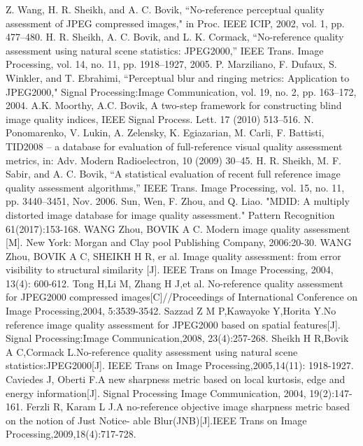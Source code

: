 \begin{thebibliography}{99}
%
%
 Z. Wang, H. R. Sheikh, and A. C. Bovik, “No-reference perceptual quality assessment of JPEG compressed images," in Proc. IEEE ICIP, 2002, vol. 1, pp. 477–480.
 H. R. Sheikh, A. C. Bovik, and L. K. Cormack, “No-reference quality assessment using natural scene statistics: JPEG2000,” IEEE Trans. Image Processing, vol. 14, no. 11, pp. 1918–1927, 2005.
 P. Marziliano, F. Dufaux, S. Winkler, and T. Ebrahimi, “Perceptual blur and ringing metrics: Application to JPEG2000," Signal Processing:Image Communication, vol. 19, no. 2, pp. 163–172, 2004.
A.K. Moorthy, A.C. Bovik, A two-step framework for constructing blind image quality indices, IEEE Signal Process. Lett. 17 (2010) 513–516.
N. Ponomarenko, V. Lukin, A. Zelensky, K. Egiazarian, M. Carli, F. Battisti, TID2008 – a database for evaluation of full-reference visual quality assessment metrics, in: Adv. Modern Radioelectron, 10 (2009) 30–45.
 H. R. Sheikh, M. F. Sabir, and A. C. Bovik, “A statistical evaluation of recent full reference image quality assessment algorithms,” IEEE Trans. Image Processing, vol. 15, no. 11, pp. 3440–3451, Nov. 2006.
 Sun, Wen, F. Zhou, and Q. Liao. "MDID: A multiply distorted image database for image quality assessment." Pattern Recognition 61(2017):153-168.
WANG Zhou, BOVIK A C. Modern image quality assessment [M]. New York: Morgan and Clay pool Publishing Company, 2006:20-30.
WANG Zhou, BOVIK A C, SHEIKH H R, er al. Image quality assessment: from error visibility to structural similarity [J]. IEEE Trans on Image Processing, 2004, 13(4): 600-612.
 Tong H,Li M, Zhang H J,et al. No-reference quality assessment for JPEG2000 compressed images[C]//Proceedings of International Conference on Image Processing,2004, 5:3539-3542.
 Sazzad Z M P,Kawayoke Y,Horita Y.No reference image quality assessment for JPEG2000 based on spatial features[J]. Signal Processing:Image Communication,2008, 23(4):257-268.
 Sheikh H R,Bovik A C,Cormack L.No-reference quality assessment using natural scene statistics:JPEG2000[J]. IEEE Trans on Image Processing,2005,14(11): 1918-1927.
 Caviedes J, Oberti F.A new sharpness metric based on local kurtosis, edge and energy information[J]. Signal Processing Image Communication, 2004, 19(2):147-161. 
 Ferzli R, Karam L J.A no-reference objective image sharpness metric based on the notion of Just Notice- able Blur(JNB)[J].IEEE Trans on Image Processing,2009,18(4):717-728. 

\end{thebibliography}
